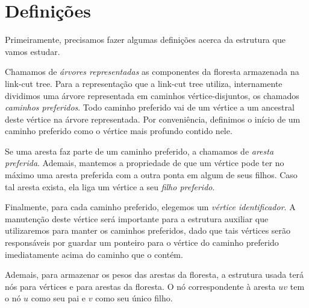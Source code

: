 \section{Definições}
\label{sec:lct-definicoes}

Primeiramente, precisamos fazer algumas definições acerca da estrutura que vamos estudar.

Chamamos de \emph{árvores representadas} as componentes da floresta armazenada na link-cut tree. Para a representação que a link-cut tree utiliza, internamente dividimos uma árvore representada em caminhos vértice-disjuntos, os chamados \emph{caminhos preferidos}. Todo caminho preferido vai de um vértice a um ancestral deste vértice na árvore representada. Por conveniência, definimos o início de um caminho preferido como o vértice mais profundo contido nele.

Se uma aresta faz parte de um caminho preferido, a chamamos de \emph{aresta preferida}. Ademais, mantemos a propriedade de que um vértice pode ter no máximo uma aresta preferida com a outra ponta em algum de seus filhos. Caso tal aresta exista, ela liga um vértice a seu \emph{filho preferido}.

Finalmente, para cada caminho preferido, elegemos um \emph{vértice identificador}. A manutenção deste vértice será importante para a estrutura auxiliar que utilizaremos para manter os caminhos preferidos, dado que tais vértices serão responsáveis por guardar um ponteiro para o vértice do caminho preferido imediatamente acima do caminho que o contém.

Ademais, para armazenar os pesos das arestas da floresta, a estrutura usada terá nós para vértices e para arestas da floresta. O nó correspondente à aresta $uv$ tem o nó $u$ como seu pai e $v$ como seu único filho.

